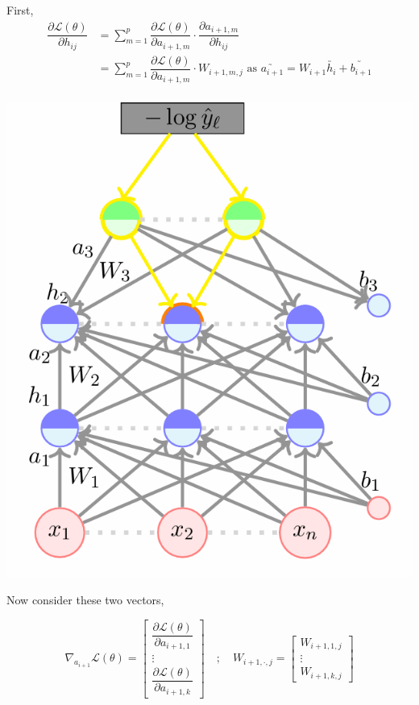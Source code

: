 \documentclass[11pt, a4paper]{article}
\begin{document}
\noindent
\begin{minipage}{0.5\textwidth}
    First, 
\begin{align*}
\dfrac{\partial \mathscr{L}(\theta)}{\partial h_{ij}} &= \sum \limits_{m = 1}^{p} \dfrac{\partial \mathscr{L}(\theta)}{\partial a_{i+1, m}} \cdot \dfrac{\partial a_{i+1, m}}{\partial h_{ij}} \\[1.5em]
&= \sum \limits_{m = 1}^{p} \dfrac{\partial \mathscr{L}(\theta)}{\partial a_{i+1, m}} \cdot W_{i+1, m, j} \,\, \text{as } \utilde{a_{i+1}} = W_{i+1} \utilde{h_i} + \utilde{b_{i+1}}\\[1.5em]
\end{align*}
\end{minipage}
\hfill
\begin{minipage}{0.45\textwidth}
    \includegraphics[scale = 0.5]{image_9.png}
\end{minipage}


Now consider these two vectors,

\[
\nabla_{a_{i+1}} \mathscr{L}(\theta) =
\begin{bmatrix}
\dfrac{\partial \mathscr{L}(\theta)}{\partial a_{i+1,1}} \\
\vdots \\
\dfrac{\partial \mathscr{L}(\theta)}{\partial a_{i+1,k}}
\end{bmatrix}
\quad ; \quad
W_{i+1,\cdot,j} =
\begin{bmatrix}
W_{i+1,1,j} \\
\vdots \\
W_{i+1,k,j}
\end{bmatrix}
\]
\end{document}
